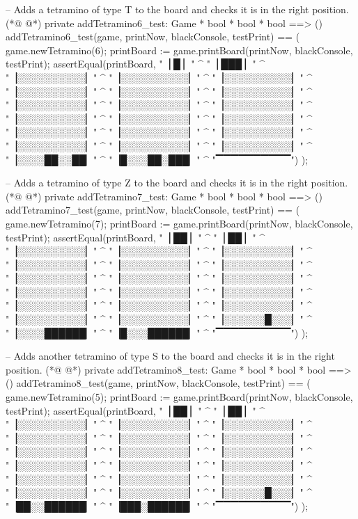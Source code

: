 \begin{vdmpp}[breaklines=true]
  -- Adds a tetramino of type T to the board and checks it is in the right position.
(*@
\label{addTetramino6:test:196}
@*)
  private addTetramino6_test: Game * bool * bool * bool ==> ()
  addTetramino6_test(game, printNow, blackConsole, testPrint) == (  
   game.newTetramino(6);
   printBoard := game.printBoard(printNow, blackConsole, testPrint);
   assertEqual(printBoard, 
    "\n▕    █     ▏" ^
    "\n▕   ███    ▏" ^
    "\n▕░░░░░░░░░░▏" ^
    "\n▕░░░░░░░░░░▏" ^
    "\n▕░░░░░░░░░░▏" ^
    "\n▕░░░░░░░░░░▏" ^
    "\n▕░░░░░░░░░░▏" ^
    "\n▕░░░░░░░░░░▏" ^
    "\n▕░░░░░░░░░░▏" ^
    "\n▕░░░░░░░░░░▏" ^
    "\n▕░░░░░░░░░░▏" ^
    "\n▕░░░░░░░░░░▏" ^
    "\n▕░░░░░░░░░░▏" ^
    "\n▕░░░░░░░░░░▏" ^
    "\n▕░░░░░░░░░░▏" ^
    "\n▕░░░░░░░░░░▏" ^
    "\n▕░░░░░░░░░░▏" ^
    "\n▕░░░░░░░░░░▏" ^
    "\n▕░░░░░░░░░░▏" ^
    "\n▕░░░░░░░░░░▏" ^
    "\n▕░░░░██░░██▏" ^
    "\n▕█░░░██░███▏" ^
    "\n ▔▔▔▔▔▔▔▔▔▔")
  );

  -- Adds a tetramino of type Z to the board and checks it is in the right position.
(*@
\label{addTetramino7:test:227}
@*)
  private addTetramino7_test: Game * bool * bool * bool ==> ()
  addTetramino7_test(game, printNow, blackConsole, testPrint) == (  
   game.newTetramino(7);
   printBoard := game.printBoard(printNow, blackConsole, testPrint);
   assertEqual(printBoard, 
    "\n▕   ██     ▏" ^
    "\n▕    ██    ▏" ^
    "\n▕░░░░░░░░░░▏" ^
    "\n▕░░░░░░░░░░▏" ^
    "\n▕░░░░░░░░░░▏" ^
    "\n▕░░░░░░░░░░▏" ^
    "\n▕░░░░░░░░░░▏" ^
    "\n▕░░░░░░░░░░▏" ^
    "\n▕░░░░░░░░░░▏" ^
    "\n▕░░░░░░░░░░▏" ^
    "\n▕░░░░░░░░░░▏" ^
    "\n▕░░░░░░░░░░▏" ^
    "\n▕░░░░░░░░░░▏" ^
    "\n▕░░░░░░░░░░▏" ^
    "\n▕░░░░░░░░░░▏" ^
    "\n▕░░░░░░░░░░▏" ^
    "\n▕░░░░░░░░░░▏" ^
    "\n▕░░░░░░░░░░▏" ^
    "\n▕░░░░░░░░░░▏" ^
    "\n▕░░░░░░█░░░▏" ^
    "\n▕░░░░██████▏" ^
    "\n▕█░░░██████▏" ^
    "\n ▔▔▔▔▔▔▔▔▔▔")
  );
  
  -- Adds another tetramino of type S to the board and checks it is in the right position.
(*@
\label{addTetramino8:test:258}
@*)
  private addTetramino8_test: Game * bool * bool * bool ==> ()
  addTetramino8_test(game, printNow, blackConsole, testPrint) == (  
   game.newTetramino(5);
   printBoard := game.printBoard(printNow, blackConsole, testPrint);
   assertEqual(printBoard, 
    "\n▕    ██    ▏" ^
    "\n▕   ██     ▏" ^
    "\n▕░░░░░░░░░░▏" ^
    "\n▕░░░░░░░░░░▏" ^
    "\n▕░░░░░░░░░░▏" ^
    "\n▕░░░░░░░░░░▏" ^
    "\n▕░░░░░░░░░░▏" ^
    "\n▕░░░░░░░░░░▏" ^
    "\n▕░░░░░░░░░░▏" ^
    "\n▕░░░░░░░░░░▏" ^
    "\n▕░░░░░░░░░░▏" ^
    "\n▕░░░░░░░░░░▏" ^
    "\n▕░░░░░░░░░░▏" ^
    "\n▕░░░░░░░░░░▏" ^
    "\n▕░░░░░░░░░░▏" ^
    "\n▕░░░░░░░░░░▏" ^
    "\n▕░░░░░░░░░░▏" ^
    "\n▕░░░░░░░░░░▏" ^
    "\n▕░░░░░░░░░░▏" ^
    "\n▕░░░░░░█░░░▏" ^
    "\n▕██░░██████▏" ^
    "\n▕███░██████▏" ^
    "\n ▔▔▔▔▔▔▔▔▔▔")
  );
  

\end{vdmpp}
